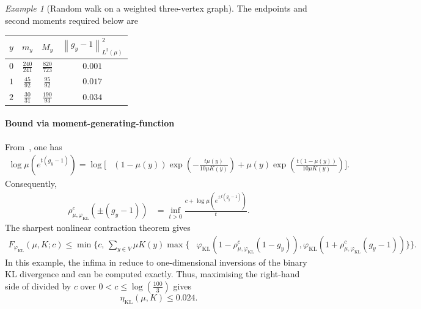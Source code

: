 \documentclass[11pt]{article}
\theoremstyle{plain}
\theoremstyle{remark}
\newtheorem{example}{Example}
\begin{document}
\begin{example}[Random walk on a weighted three-vertex graph]
The endpoints and second moments required below are
\begin{center}
\small
\setlength{\tabcolsep}{4pt}
\renewcommand{\arraystretch}{1.15}
\begin{tabular}{@{}cccc@{}}
\hline
$y$
&
$m_y$
&
$M_y$
&
{\scriptsize$\left\lVert g_y-1\right\rVert_{L^2(\mu)}^2$}
\\
\hline
$0$
&
$\frac{240}{241}$
&
$\frac{820}{723}$
&
$0.001$
\\[1mm]
$1$
&
$\frac{45}{92}$
&
$\frac{95}{92}$
&
$0.017$
\\[1mm]
$2$
&
$\frac{30}{31}$
&
$\frac{190}{93}$
&
$0.034$
\\
\hline
\end{tabular}
\end{center}

\paragraph*{Bound via moment-generating-function}
From~, one has
\begin{align}
\log\mu\left(e^{t(g_y-1)}\right)
=
\log\Bigg[
&
(1-\mu(y))
\exp\left(
-\frac{t\mu(y)}{10\mu K(y)}
\right)+
\mu(y)
\exp\left(
\frac{t(1-\mu(y))}{10\mu K(y)}
\right)
\Bigg].
\label{eq:biasedRefreshmentExactMGF}
\end{align}
Consequently,
\begin{align}
\rho_{\mu,\varphi_{\mathrm{KL}}}^{c}(\pm (g_y-1))
&=
\inf_{t>0}
\frac{
c+\log\mu\left(e^{\pm t(g_y-1)}\right)
}{t}.
\label{eq:biasedRefreshmentExactGauges}
\end{align}
The sharpest nonlinear contraction theorem gives
\begin{align}
F_{\varphi_{\mathrm{KL}}}(\mu,K;c)
\leq
\min\Bigg\{
c,\,
\sum_{y\in V}
\mu K(y)
\max\Bigg\{
&
\varphi_{\mathrm{KL}}\left(
1-
\rho_{\mu,\varphi_{\mathrm{KL}}}^{c}(1-g_y)
\right),
\varphi_{\mathrm{KL}}\left(
1+
\rho_{\mu,\varphi_{\mathrm{KL}}}^{c}(g_y-1)
\right)
\Bigg\}
\Bigg\}.
\label{eq:biasedRefreshmentExactMGFContraction}
\end{align}
In this example, the infima in  reduce to one-dimensional inversions of the binary KL divergence and can be computed exactly. Thus, maximising the right-hand side of
 divided by $c$ over $0<c\leq
\log\left(\frac{100}{3}\right)$ 
gives
\begin{equation}
\eta_{\mathrm{KL}}(\mu,K)
\leq
0.024.
\label{eq:biasedRefreshmentExactMGFSDPI}
\end{equation}


\end{example}
\end{document}
